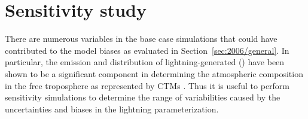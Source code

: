 %

\section{Sensitivity study}\label{sec:2006/sens}

There are numerous variables in the base case simulations that could have contributed to the model biases as evaluated in Section~\ref{sec:2006/general}. In
particular, the emission and distribution of lightning-generated  (\lnox) have been shown to be a significant component in determining the
atmospheric composition in the free troposphere as represented by CTMs \citep{Labrador:2005uq,Cooper:2009nx,Ott:2010lo}. Thus it is useful to perform
sensitivity simulations to determine the range of variabilities caused by the uncertainties and biases in the lightning parameterization.

